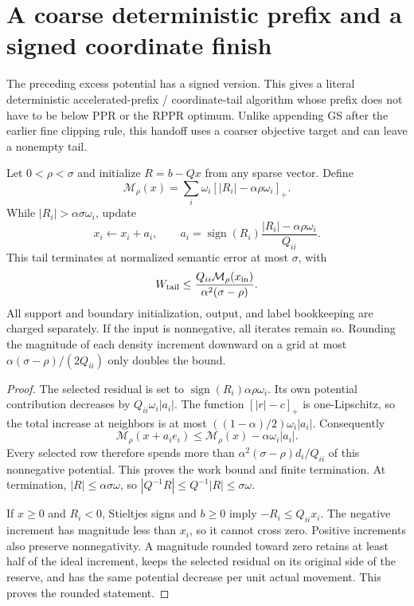 \section{A coarse deterministic prefix and a signed coordinate finish}
\label{sec:revisit-deterministic-signed}
The preceding excess potential has a signed version. This gives a literal
deterministic accelerated-prefix / coordinate-tail algorithm whose prefix
does not have to be below PPR or the RPPR optimum. Unlike appending GS after
the earlier fine clipping rule, this handoff uses a coarser objective target
and can leave a nonempty tail.

\begin{lemma}
\label{lem:revisit-signed-excess}
Let $0<\rho<\sigma$ and initialize $R=b-Qx$ from any sparse vector.
Define
\[
 \mathcal M_\rho(x)=\sum_i\omega_i[|R_i|-\alpha\rho\omega_i]_+.
\]
While $|R_i|>\alpha\sigma\omega_i$, update
\begin{equation}
 x_i\gets x_i+a_i,\qquad
 a_i=\operatorname{sign}(R_i)
            \frac{|R_i|-\alpha\rho\omega_i}{Q_{ii}}.
 \label{eq:revisit-signed-coordinate}
\end{equation}
This tail terminates at normalized semantic error at most $\sigma$, with
\begin{equation}
 W_{\rm tail}\leq
 \frac{Q_{ii}\mathcal M_\rho(x_{\rm in})}
      {\alpha^2(\sigma-\rho)}.
 \label{eq:revisit-signed-tail-work}
\end{equation}
All support and boundary initialization, output, and label bookkeeping are
charged separately. If the input is nonnegative, all iterates remain so.
Rounding the magnitude of each density increment downward on a grid at
most $\alpha(\sigma-\rho)/(2Q_{ii})$ only doubles the bound.
\end{lemma}
\begin{proof}
The selected residual is set to
$\operatorname{sign}(R_i)\alpha\rho\omega_i$. Its own potential
contribution decreases by $Q_{ii}\omega_i|a_i|$. The function
$[|r|-c]_+$ is one-Lipschitz, so the total increase at neighbors is at
most $((1-\alpha)/2)\omega_i|a_i|$. Consequently
\[
 \mathcal M_\rho(x+a_i e_i)
 \leq\mathcal M_\rho(x)-\alpha\omega_i|a_i|.
\]
Every selected row therefore spends more than
$\alpha^2(\sigma-\rho)d_i/Q_{ii}$ of this nonnegative potential.
This proves the work bound and finite termination. At termination,
$|R|\leq\alpha\sigma\omega$, so
$|Q^{-1}R|\leq Q^{-1}|R|\leq\sigma\omega$.

If $x\geq0$ and $R_i<0$, Stieltjes signs and $b\geq0$ imply
$-R_i\leq Q_{ii}x_i$. The negative increment has magnitude less than
$x_i$, so it cannot cross zero. Positive increments also preserve
nonnegativity. A magnitude rounded toward zero retains at least half of
the ideal increment, keeps the selected residual on its original side of
the reserve, and has the same potential decrease per unit actual movement.
This proves the rounded statement.
\end{proof}

